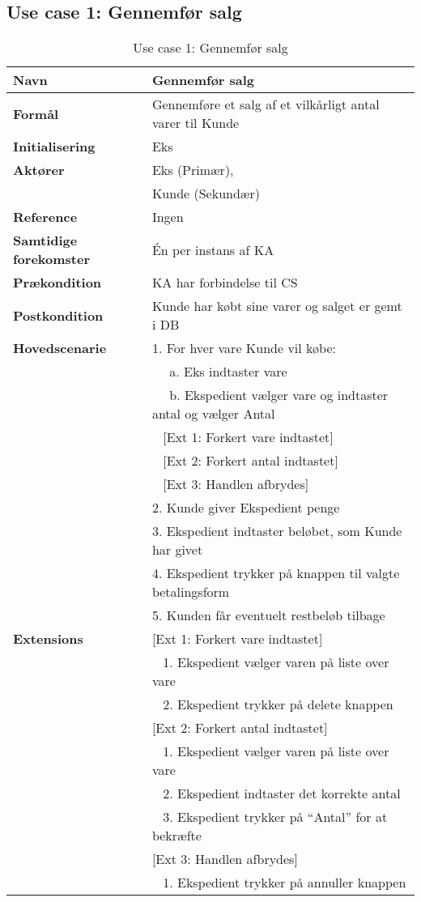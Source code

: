 \subsection{Use case 1: Gennemfør salg}


\begin{table}[H]
\begin{tabularx}{\textwidth}{|l|X|}
\hline
\textbf{Navn}					& Gennemfør salg \\\hline
\textbf{Formål}					& Gennemføre et salg af et vilkårligt antal varer til \gls{Kunde} \\\hline
\textbf{Initialisering}			& \gls{Eks} \\\hline
\textbf{Aktører}				& \gls{Eks} (Primær), \\& \gls{Kunde} (Sekundær) \\\hline
\textbf{Reference}				& Ingen \\\hline
								
\textbf{Samtidige forekomster}	& Én per instans af \gls{KA} \\\hline
\textbf{Prækondition}			& \gls{KA} har forbindelse til \gls{CS} \\\hline
\textbf{Postkondition}			& \gls{Kunde} har købt sine varer og salget er gemt i \gls{DB} \\\hline
\textbf{Hovedscenarie}			
& 1. For hver vare \gls{Kunde} vil købe:\\		
& ~~ a. \gls{Eks} indtaster vare \\
& ~~ b. Ekspedient vælger vare og indtaster antal og vælger Antal \\
& ~ [Ext 1: Forkert vare indtastet] \\
& ~ [Ext 2: Forkert antal indtastet] \\
& ~ [Ext 3: Handlen afbrydes] \\
& 2. Kunde giver Ekspedient penge \\
& 3. Ekspedient indtaster beløbet, som Kunde har givet \\
& 4. Ekspedient trykker på knappen til valgte betalingsform \\
& 5. Kunden får eventuelt restbeløb tilbage \\
\hline

\textbf{Extensions}				
& [Ext 1: Forkert vare indtastet] \\
& ~ 1. Ekspedient vælger varen på liste over vare \\
& ~ 2. Ekspedient trykker på delete knappen \\
& [Ext 2: Forkert antal indtastet] \\
& ~ 1. Ekspedient vælger varen på liste over vare \\
& ~ 2. Ekspedient indtaster det korrekte antal \\
& ~ 3. Ekspedient trykker på “Antal” for at bekræfte \\
& [Ext 3: Handlen afbrydes] \\
& ~ 1. Ekspedient trykker på annuller knappen \\
\hline

\end{tabularx}
\caption{Use case 1: Gennemfør salg}
\label{tab:UCgfs}
\end{table}